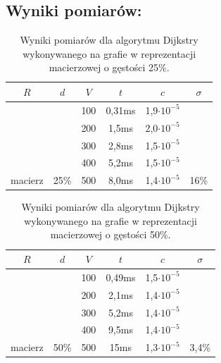 \documentclass[a4paper,12pt]{article}
\begin{document}
\subsection{Wyniki pomiarów:}

\begin{table}[H]
	\centering
	\caption{\centering Wyniki pomiarów dla algorytmu Dijkstry wykonywanego na grafie w reprezentacji macierzowej o gęstości 25\%.}
	\begin{tabular}{|c|c|c|c|c|c|}
		\hline
		\rowcolor[HTML]{C0C0C0} 
		$R$                       & $d$                    & $V$ & $t$    & $c$                & $\sigma$               \\ \hline
		&                        & 100 & 0,31ms & 1,9$\cdot 10^{-5}$ &                        \\ \cline{3-5}
		&                        & 200 & 1,5ms  & 2,0$\cdot 10^{-5}$ &                        \\ \cline{3-5}
		&                        & 300 & 2,8ms  & 1,5$\cdot 10^{-5}$ &                        \\ \cline{3-5}
		&                        & 400 & 5,2ms  & 1,5$\cdot 10^{-5}$ &                        \\ \cline{3-5}
		\multirow{-5}{*}{macierz} & \multirow{-5}{*}{25\%} & 500 & 8,0ms  & 1,4$\cdot 10^{-5}$ & \multirow{-5}{*}{16\%} \\ \hline
	\end{tabular}
\end{table}

\begin{table}[H]
	\centering
	\caption{\centering Wyniki pomiarów dla algorytmu Dijkstry wykonywanego na grafie w reprezentacji macierzowej o gęstości 50\%.}
	\begin{tabular}{|c|c|c|c|c|c|}
		\hline
		\rowcolor[HTML]{C0C0C0} 
		$R$                       & $d$                    & $V$ & $t$    & $c$                & $\sigma$                \\ \hline
		&                        & 100 & 0,49ms & 1,5$\cdot 10^{-5}$ &                         \\ \cline{3-5}
		&                        & 200 & 2,1ms  & 1,4$\cdot 10^{-5}$ &                         \\ \cline{3-5}
		&                        & 300 & 5,2ms  & 1,4$\cdot 10^{-5}$ &                         \\ \cline{3-5}
		&                        & 400 & 9,5ms  & 1,4$\cdot 10^{-5}$ &                         \\ \cline{3-5}
		\multirow{-5}{*}{macierz} & \multirow{-5}{*}{50\%} & 500 & 15ms   & 1,3$\cdot 10^{-5}$ & \multirow{-5}{*}{3,4\%} \\ \hline
	\end{tabular}
\end{table}
\end{document}
